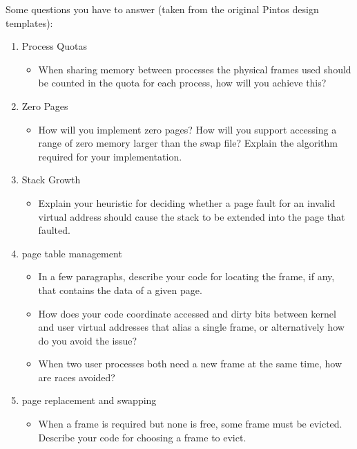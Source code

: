 Some questions you have to answer (taken from the original Pintos design templates):
\begin{enumerate}
    \item Process Quotas
        \begin{itemize}
            \item When sharing memory between processes the physical frames used should be counted in the quota for each process, how will you achieve this?
        \end{itemize}
				
	  \item Zero Pages
        \begin{itemize}
            \item How will you implement zero pages? How will you support accessing a range of zero memory larger than the swap file? Explain the algorithm required for your implementation.
        \end{itemize}			
				
		\item Stack Growth
        \begin{itemize}
            \item Explain your heuristic for deciding whether a page fault for an invalid virtual address should cause the stack to be extended into the page that faulted. 
        \end{itemize}		

    \item page table management
        \begin{itemize}
            \item In a few paragraphs, describe your code for locating the frame, if any, that contains the data of a given page.
            
            \item How does your code coordinate accessed and dirty bits between kernel and user virtual addresses that alias a single frame, or alternatively how do you avoid the issue?
            
            \item When two user processes both need a new frame at the same time, how are races avoided?
        \end{itemize}
    
    \item page replacement and swapping
        \begin{itemize}
            \item When a frame is required but none is free, some frame must be evicted.  Describe your code for choosing a frame to evict.
            

\end{itemize}
\end{enumerate}
